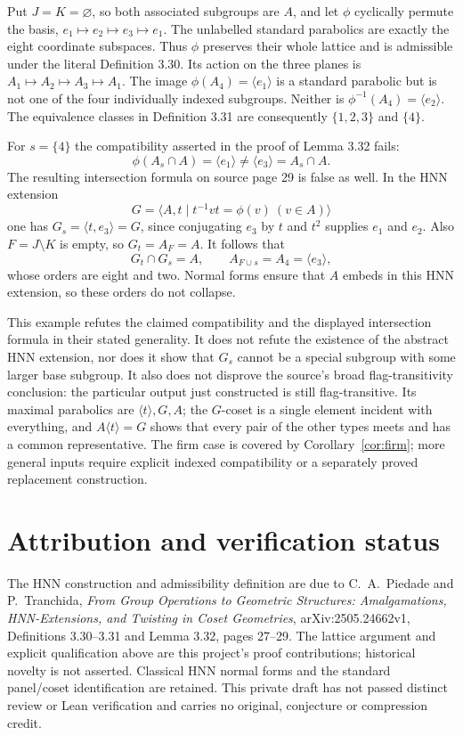 Put $J=K=\varnothing$, so both associated subgroups are $A$, and let
$\phi$ cyclically permute the basis,
$e_1\mapsto e_2\mapsto e_3\mapsto e_1$.
The unlabelled standard parabolics are exactly the eight coordinate
subspaces. Thus $\phi$ preserves their whole lattice and is admissible
under the literal Definition 3.30. Its action on the three planes is
$A_1\mapsto A_2\mapsto A_3\mapsto A_1$. The image
$\phi(A_4)=\langle e_1\rangle$ is a standard parabolic but is not one
of the four individually indexed subgroups. Neither is
$\phi^{-1}(A_4)=\langle e_2\rangle$.
The equivalence classes in Definition 3.31 are consequently
$\{1,2,3\}$ and $\{4\}$.

For $s=\{4\}$ the compatibility asserted in the proof of Lemma 3.32
fails:
\[
 \phi(A_s\cap A)=\langle e_1\rangle
 \ne\langle e_3\rangle=A_s\cap A.
\]
The resulting intersection formula on source page 29 is false as well.
In the HNN extension
\[
 G=\langle A,t\mid t^{-1}vt=\phi(v)\ (v\in A)\rangle
\]
one has $G_s=\langle t,e_3\rangle=G$, since conjugating $e_3$ by
$t$ and $t^2$ supplies $e_1$ and $e_2$. Also $F=J\setminus K$ is
empty, so $G_t=A_F=A$. It follows that
\[
 G_t\cap G_s=A,\qquad A_{F\cup s}=A_4=\langle e_3\rangle,
\]
whose orders are eight and two. Normal forms ensure that $A$ embeds
in this HNN extension, so these orders do not collapse.

This example refutes the claimed compatibility and the displayed
intersection formula in their stated generality. It does not refute
the existence of the abstract HNN extension, nor does it show that
$G_s$ cannot be a special subgroup with some larger base subgroup.
It also does not disprove the source's broad flag-transitivity conclusion:
the particular output just constructed is still flag-transitive. Its
maximal parabolics are $\langle t\rangle,G,A$; the $G$-coset is a
single element incident with everything, and $A\langle t\rangle=G$
shows that every pair of the other types meets and has a common
representative.
The firm case is covered by Corollary~\ref{cor:firm}; more general
inputs require explicit indexed compatibility or a separately proved
replacement construction.

\section*{Attribution and verification status}
The HNN construction and admissibility definition are due to
C.~A.~Piedade and P.~Tranchida, \emph{From Group Operations to Geometric
Structures: Amalgamations, HNN-Extensions, and Twisting in Coset Geometries},
arXiv:2505.24662v1, Definitions 3.30--3.31 and Lemma 3.32, pages 27--29.
The lattice argument and explicit qualification above are this project's
proof contributions; historical novelty is not asserted. Classical HNN
normal forms and the standard panel/coset identification are retained.
This private draft has not passed distinct review or Lean verification
and carries no original, conjecture or compression credit.

